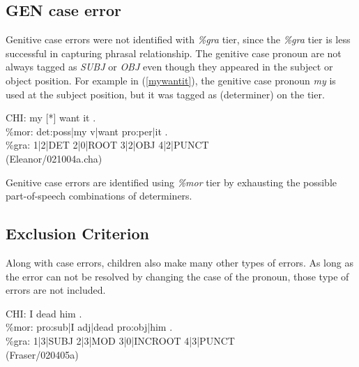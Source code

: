 \subsection{GEN case error}
Genitive case errors were not identified with \textit{\%gra} tier, since the \textit{\%gra} tier is less successful in capturing phrasal relationship. The genitive case pronoun are  not always tagged as \textit{SUBJ} or \textit{OBJ} even though they appeared in the subject or object position. For example in (\ref{mywantit}), the genitive case pronoun \textit{my} is used at the subject position, but it was tagged as  (determiner) on the  tier. 
\begin{exe}
\ex \label{mywantit} \gll  *CHI:	my [*] want it .  \\     
\%mor:	det:poss|my v|want pro:per|it .\\
\%gra:	1|2|DET 2|0|ROOT 3|2|OBJ 4|2|PUNCT\\
(Eleanor/021004a.cha)
\end{exe}

Genitive case errors are identified using \textit{\%mor} tier by exhausting the possible part-of-speech combinations of determiners. 
\subsection{Exclusion Criterion}
Along with case errors, children also make many other types of errors. As long as the error can not be resolved by changing the case of the pronoun, those type of errors are not included. 
\begin{exe}
\ex \gll *CHI:	I dead him .\\
\%mor:	pro:sub|I adj|dead pro:obj|him .\\
\%gra:	1|3|SUBJ 2|3|MOD 3|0|INCROOT 4|3|PUNCT\\ 
(Fraser/020405a)
\end{exe}